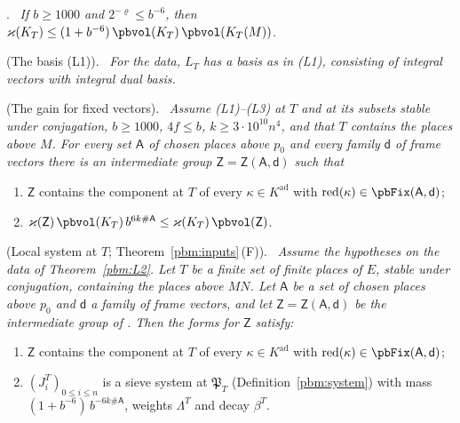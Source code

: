 \documentclass[10pt]{amsart}
\theoremstyle{definition}
\theoremstyle{remark}
\providecommand{\pffK}{K_T}
\providecommand{\pffKM}{K_T(M)}
\providecommand{\pffZ}{\mathsf Z}
\providecommand{\pffm}{\varkappa}
\newenvironment{quotedthm}[2]{\par\medskip\noindent\begingroup
  \textbf{#1}#2.\ \itshape\ignorespaces}{\endgroup\par\medskip}
\begin{document}
\begin{quotedthm}{\cite[Corollary~5.12]{P52}}{}
If $b\ge1000$ and $2^{-\varrho}\le b^{-6}$, then $\pffm(\pffK)\le(1+b^{-6})\,\pbvol(\pffK)\,
\pbvol(\pffKM)$.
\end{quotedthm}

\begin{quotedthm}{\cite[Lemma~5.13]{P52}}{ (The basis (L1))}
For the data, $L_T$ has a basis as in \textup{(L1)}, consisting of integral vectors with integral
dual basis.
\end{quotedthm}

\begin{quotedthm}{\cite[Theorem~5.24]{P52}}{ (The gain for fixed vectors)}
Assume (L1)--(L3) at $T$ and at its subsets stable under conjugation, $b\ge1000$, $4f\le b$,
$k\ge3\cdot10^{10}n^4$, and that $T$ contains the places above $M$. For every set $\mathsf A$ of
chosen places above $p_0$ and every family $\mathsf d$ of frame vectors there is an intermediate
group $\pffZ=\pffZ(\mathsf A,\mathsf d)$ such that
\begin{enumerate}
\item[(a)] $\pffZ$ contains the component at $T$ of every $\kappa\in K^{\mathrm{ad}}$ with
$\mathrm{red}(\kappa)\in\pbFix(\mathsf A,\mathsf d)$;
\item[(b)] $\pffm(\pffZ)\,\pbvol(\pffK)\,b^{6k\#\mathsf A}\le\pffm(\pffK)\,\pbvol(\pffZ)$.
\end{enumerate}
\end{quotedthm}

\begin{quotedthm}{\cite[Theorem~5.28]{P52}}{ (Local system at $T$; Theorem~\ref{pbm:inputs}\,\textup{(F)})}
Assume the hypotheses on the data of Theorem~\ref{pbm:L2}. Let $T$ be a finite set of finite places
of $E$, stable under conjugation, containing the places above $MN$. Let $\mathsf A$ be a set of
chosen places above $p_0$ and $\mathsf d$ a family of frame vectors, and let $\pffZ=\pffZ(\mathsf A,
\mathsf d)$ be the intermediate group of {\cite[Theorem~5.24]{P52}}. Then the forms
{\cite[(12)]{P52}} for $\pffZ$ satisfy:
\begin{enumerate}
\item[(a)] $\pffZ$ contains the component at $T$ of every $\kappa\in K^{\mathrm{ad}}$ with
$\mathrm{red}(\kappa)\in\pbFix(\mathsf A,\mathsf d)$;
\item[(b)] $(J^T_i)_{0\le i\le n}$ is a sieve system at $\mathfrak P_T$
(Definition~\ref{pbm:system}) with mass $(1+b^{-6})\,b^{-6k\#\mathsf A}$, weights $\Lambda^T$ and
decay $\beta^T$.
\end{enumerate}
\end{quotedthm}
\end{document}
